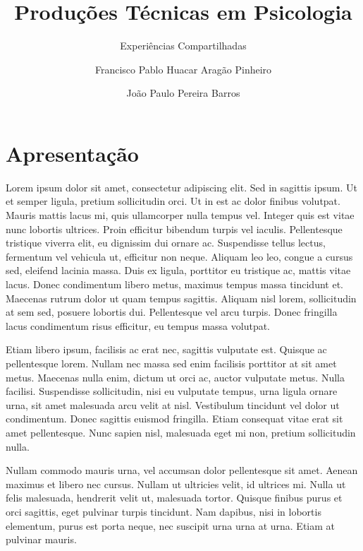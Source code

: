 \documentclass[
  letterpaper,
  DIV=11,
  numbers=noendperiod,
  oneside]{scrreprt}
\title{Produções Técnicas em Psicologia}
\subtitle{Experiências Compartilhadas}
\author{Francisco Pablo Huacar Aragão Pinheiro \and João Paulo Pereira
Barros}
\date{}
\renewcommand*\contentsname{Índice}
\newcommand\contentsname{Índice}
\begin{document}
\maketitle
\ifdefined\Shaded\renewenvironment{Shaded}{\begin{tcolorbox}[sharp corners, borderline west={3pt}{0pt}{shadecolor}, interior hidden, enhanced, frame hidden, boxrule=0pt, breakable]}{\end{tcolorbox}}\fi

\renewcommand*\contentsname{Sumário}
{
\hypersetup{linkcolor=}
\setcounter{tocdepth}{2}
\tableofcontents
}

\hypertarget{apresentauxe7uxe3o}{%
\chapter*{Apresentação}\label{apresentauxe7uxe3o}}


Lorem ipsum dolor sit amet, consectetur adipiscing elit. Sed in sagittis
ipsum. Ut et semper ligula, pretium sollicitudin orci. Ut in est ac
dolor finibus volutpat. Mauris mattis lacus mi, quis ullamcorper nulla
tempus vel. Integer quis est vitae nunc lobortis ultrices. Proin
efficitur bibendum turpis vel iaculis. Pellentesque tristique viverra
elit, eu dignissim dui ornare ac. Suspendisse tellus lectus, fermentum
vel vehicula ut, efficitur non neque. Aliquam leo leo, congue a cursus
sed, eleifend lacinia massa. Duis ex ligula, porttitor eu tristique ac,
mattis vitae lacus. Donec condimentum libero metus, maximus tempus massa
tincidunt et. Maecenas rutrum dolor ut quam tempus sagittis. Aliquam
nisl lorem, sollicitudin at sem sed, posuere lobortis dui. Pellentesque
vel arcu turpis. Donec fringilla lacus condimentum risus efficitur, eu
tempus massa volutpat.

Etiam libero ipsum, facilisis ac erat nec, sagittis vulputate est.
Quisque ac pellentesque lorem. Nullam nec massa sed enim facilisis
porttitor at sit amet metus. Maecenas nulla enim, dictum ut orci ac,
auctor vulputate metus. Nulla facilisi. Suspendisse sollicitudin, nisi
eu vulputate tempus, urna ligula ornare urna, sit amet malesuada arcu
velit at nisl. Vestibulum tincidunt vel dolor ut condimentum. Donec
sagittis euismod fringilla. Etiam consequat vitae erat sit amet
pellentesque. Nunc sapien nisl, malesuada eget mi non, pretium
sollicitudin nulla.

Nullam commodo mauris urna, vel accumsan dolor pellentesque sit amet.
Aenean maximus et libero nec cursus. Nullam ut ultricies velit, id
ultrices mi. Nulla ut felis malesuada, hendrerit velit ut, malesuada
tortor. Quisque finibus purus et orci sagittis, eget pulvinar turpis
tincidunt. Nam dapibus, nisi in lobortis elementum, purus est porta
neque, nec suscipit urna urna at urna. Etiam at pulvinar mauris.
\end{document}
